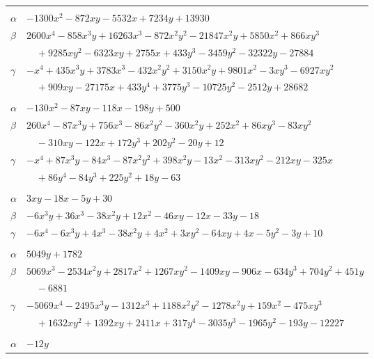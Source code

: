 \documentclass[11pt]{article}
\begin{document}
\begin{longtable}{@{}ll@{}}
\addlinespace[3pt]
\multicolumn{2}{@{}l}{$\{i,j\}=\{42,145\}$, $k_{ij}=2^{2}\cdot 3^{2}\cdot 7\cdot 13^{2}$}\\
$\alpha$ & $-1300x^{2}-872xy-5532x+7234y+13930$\\
$\beta$ & $2600x^{4}-858x^{3}y+16263x^{3}-872x^{2}y^{2}-21847x^{2}y+5850x^{2}+866xy^{3}$\\
 & $\quad +9285xy^{2}-6323xy+2755x+433y^{3}-3459y^{2}-32322y-27884$\\
$\gamma$ & $-x^{4}+435x^{3}y+3783x^{3}-432x^{2}y^{2}+3150x^{2}y+9801x^{2}-3xy^{3}-6927xy^{2}$\\
 & $\quad +909xy-27175x+433y^{4}+3775y^{3}-10725y^{2}-2512y+28682$\\
\addlinespace[3pt]
\multicolumn{2}{@{}l}{$\{i,j\}=\{42,148\}$, $k_{ij}=2^{3}\cdot 3^{3}\cdot 7$}\\
$\alpha$ & $-130x^{2}-87xy-118x-198y+500$\\
$\beta$ & $260x^{4}-87x^{3}y+756x^{3}-86x^{2}y^{2}-360x^{2}y+252x^{2}+86xy^{3}-83xy^{2}$\\
 & $\quad -310xy-122x+172y^{3}+202y^{2}-20y+12$\\
$\gamma$ & $-x^{4}+87x^{3}y-84x^{3}-87x^{2}y^{2}+398x^{2}y-13x^{2}-313xy^{2}-212xy-325x$\\
 & $\quad +86y^{4}-84y^{3}+225y^{2}+18y-63$\\
\addlinespace[3pt]
\multicolumn{2}{@{}l}{$\{i,j\}=\{42,174\}$, $k_{ij}=2^{3}\cdot 3^{2}$}\\
$\alpha$ & $3xy-18x-5y+30$\\
$\beta$ & $-6x^{3}y+36x^{3}-38x^{2}y+12x^{2}-46xy-12x-33y-18$\\
$\gamma$ & $-6x^{4}-6x^{3}y+4x^{3}-38x^{2}y+4x^{2}+3xy^{2}-64xy+4x-5y^{2}-3y+10$\\
\addlinespace[3pt]
\multicolumn{2}{@{}l}{$\{i,j\}=\{42,215\}$, $k_{ij}=2^{2}\cdot 3^{5}\cdot 11$}\\
$\alpha$ & $5049y+1782$\\
$\beta$ & $5069x^{3}-2534x^{2}y+2817x^{2}+1267xy^{2}-1409xy-906x-634y^{3}+704y^{2}+451y$\\
 & $\quad -6881$\\
$\gamma$ & $-5069x^{4}-2495x^{3}y-1312x^{3}+1188x^{2}y^{2}-1278x^{2}y+159x^{2}-475xy^{3}$\\
 & $\quad +1632xy^{2}+1392xy+2411x+317y^{4}-3035y^{3}-1965y^{2}-193y-12227$\\
\addlinespace[3pt]
\multicolumn{2}{@{}l}{$\{i,j\}=\{43,57\}$, $k_{ij}=2^{4}\cdot 3$}\\
$\alpha$ & $-12y$\\

\end{longtable}
\end{document}
